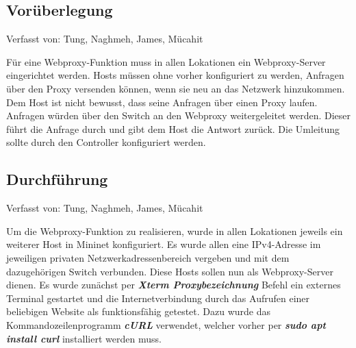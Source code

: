 \documentclass[fontsize=12pt,paper=a4,open=any,parskip=half,
  twoside=false,toc=listof,toc=bibliography,fleqn,leqno,
  captions=nooneline,captions=tableabove,british]{scrbook}
\begin{document}
\subsection{Vorüberlegung}
{\tiny Verfasst von: Tung, Naghmeh, James, Mücahit\par}
Für eine Webproxy-Funktion muss in allen Lokationen ein Webproxy-Server eingerichtet werden. Hosts müssen ohne vorher konfiguriert zu werden, Anfragen über den Proxy versenden können, wenn sie neu an das Netzwerk hinzukommen. Dem Host ist nicht bewusst, dass seine Anfragen über einen Proxy laufen. Anfragen würden über den Switch an den Webproxy weitergeleitet werden. Dieser führt die Anfrage durch und gibt dem Host die Antwort zurück. Die Umleitung sollte durch den Controller konfiguriert werden. 

\subsection{Durchführung}
{\tiny Verfasst von: Tung, Naghmeh, James, Mücahit\par}
Um die Webproxy-Funktion zu realisieren, wurde in allen Lokationen jeweils ein weiterer Host in Mininet konfiguriert. Es wurde allen eine IPv4-Adresse im jeweiligen privaten Netzwerkadressenbereich vergeben und mit dem dazugehörigen Switch verbunden. Diese Hosts sollen nun als Webproxy-Server dienen. Es wurde zunächst per \textit{\textbf{Xterm Proxybezeichnung}} Befehl ein externes Terminal gestartet und die Internetverbindung durch das Aufrufen einer beliebigen Website als funktionsfähig getestet. Dazu wurde das Kommandozeilenprogramm \textit{\textbf{cURL}} verwendet, welcher vorher per \textit{\textbf{sudo apt install curl}} installiert werden muss.
\end{document}

